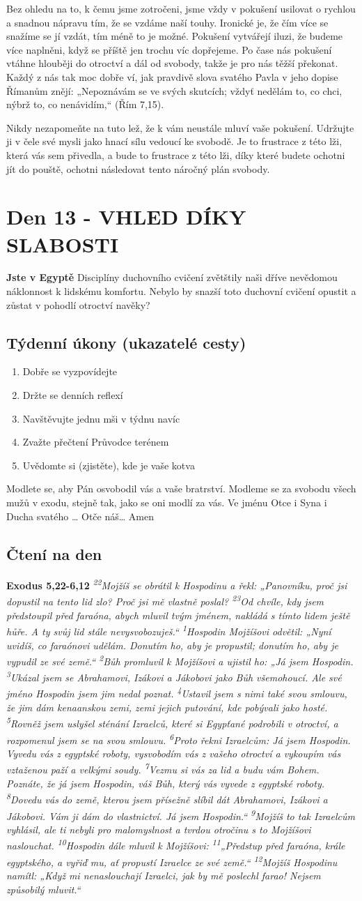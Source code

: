 \documentclass[11pt]{article}
\newcommand{\zacatekDruhyTyden}{
  \textbf{Jste v Egyptě} \newline
  Disciplíny duchovního cvičení zvětštily naši dříve nevědomou náklonnost k lidskému komfortu.
  Nebylo by snazší toto duchovní cvičení opustit a zůstat v pohodlí otroctví navěky?

  \subsection*{Týdenní úkony (ukazatelé cesty)}
\begin{enumerate}
  \item Dobře se vyzpovídejte
  \item Držte se denních reflexí
  \item Navštěvujte jednu mši v týdnu navíc
  \item Zvažte přečtení Průvodce terénem
  \item Uvědomte si (zjistěte), kde je vaše kotva
\end{enumerate}
Modlete se, aby Pán osvobodil vás a vaše bratrství. \newline
Modleme se za svobodu všech mužů v exodu, stejně tak, jako se oni modlí za vás.\newline
Ve jménu Otce i Syna i Ducha svatého …  Otče náš… Amen
}
\begin{document}
Bez ohledu na to, k čemu jsme zotročeni, jsme vždy v pokušení usilovat o rychlou a snadnou nápravu tím, že se
vzdáme naší touhy. Ironické je, že čím více se snažíme se jí vzdát, tím méně to je možné. Pokušení vytvářejí iluzi,
že budeme více naplněni, když se příště jen trochu víc dopřejeme. Po čase nás pokušení vtáhne hlouběji do otroctví
a dál od svobody, takže je pro nás těžší překonat. Každý z nás tak moc dobře ví, jak pravdivě slova svatého Pavla v
jeho dopise Římanům znějí: „Nepoznávám se ve svých skutcích; vždyť nedělám to, co chci, nýbrž to, co
nenávidím,“ (Řím 7,15).

Nikdy nezapomeňte na tuto lež, že k vám neustále mluví vaše pokušení. Udržujte ji v čele své mysli jako hnací sílu
vedoucí ke svobodě. Je to frustrace z této lži, která vás sem přivedla, a bude to frustrace z této lži, díky které budete
ochotni jít do pouště, ochotni následovat tento náročný plán svobody.

\newpage
\section{Den 13 - VHLED DÍKY SLABOSTI}
\zacatekDruhyTyden
\subsection*{Čtení na den}
\textbf{Exodus 5,22-6,12}
\newline
\textit{
\textsuperscript{22}Mojžíš se obrátil k Hospodinu a řekl: „Panovníku, proč jsi dopustil na tento lid zlo? Proč jsi mě vlastně poslal?
\textsuperscript{23}Od chvíle, kdy jsem předstoupil před faraóna, abych mluvil tvým jménem, nakládá s tímto lidem ještě hůře. A ty svůj lid stále nevysvobozuješ.“
\textsuperscript{1}Hospodin Mojžíšovi odvětil: „Nyní uvidíš, co faraónovi udělám. Donutím ho, aby je propustil; donutím ho, aby je vypudil ze své země.“
\textsuperscript{2}Bůh promluvil k Mojžíšovi a ujistil ho: „Já jsem Hospodin.
\textsuperscript{3}Ukázal jsem se Abrahamovi, Izákovi a Jákobovi jako Bůh všemohoucí. Ale své jméno Hospodin jsem jim nedal poznat.
\textsuperscript{4}Ustavil jsem s nimi také svou smlouvu, že jim dám kenaanskou zemi, zemi jejich putování, kde pobývali jako hosté.
\textsuperscript{5}Rovněž jsem uslyšel sténání Izraelců, které si Egypťané podrobili v otroctví, a rozpomenul jsem se na svou smlouvu.
\textsuperscript{6}Proto řekni Izraelcům: Já jsem Hospodin. Vyvedu vás z egyptské roboty, vysvobodím vás z vašeho otroctví a vykoupím vás vztaženou paží a velkými soudy.
\textsuperscript{7}Vezmu si vás za lid a budu vám Bohem. Poznáte, že já jsem Hospodin, váš Bůh, který vás vyvede z egyptské roboty.
\textsuperscript{8}Dovedu vás do země, kterou jsem přísežně slíbil dát Abrahamovi, Izákovi a Jákobovi. Vám ji dám do vlastnictví. Já jsem Hospodin.“
\textsuperscript{9}Mojžíš to tak Izraelcům vyhlásil, ale ti nebyli pro malomyslnost a tvrdou otročinu s to Mojžíšovi naslouchat.
\textsuperscript{10}Hospodin dále mluvil k Mojžíšovi:
\textsuperscript{11}„Předstup před faraóna, krále egyptského, a vyřiď mu, ať propustí Izraelce ze své země.“
\textsuperscript{12}Mojžíš Hospodinu namítl: „Když mi nenaslouchají Izraelci, jak by mě poslechl farao! Nejsem způsobilý mluvit.“
}
\end{document}
